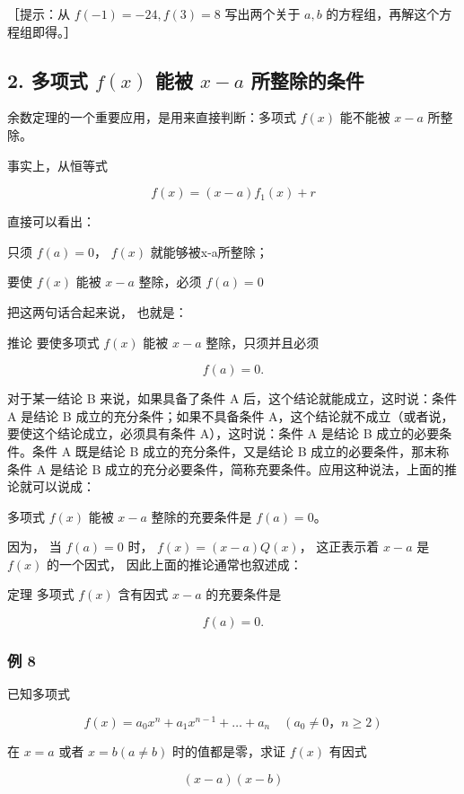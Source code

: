 ［提示：从 \(f(-1) = -24, f(3) = 8\) 写出两个关于 \(a, b\)
的方程组，再解这个方程组即得。］

\subsection{\texorpdfstring{2. 多项式 \(f(x)\) 能被 \(x - a\) 所整除的条件}{2. 多项式 f(x) 能被 x - a 所整除的条件}}

余数定理的一个重要应用，是用来直接判断：多项式 \(f(x)\) 能不能被
\(x - a\) 所整除。

事实上，从恒等式

\[
f (x) = (x - a) f _ {1} (x) + r
\]

直接可以看出：

只须 \(f(a)=0\)， \(f(x)\) 就能够被x-a所整除；

要使 \(f(x)\) 能被 \(x - a\) 整除，必须 \(f(a) = 0\)

把这两句话合起来说， 也就是：

推论 要使多项式 \(f(x)\) 能被 \(x - a\) 整除，只须并且必须

\[
f (a) = 0.
\]

 对于某一结论 B 来说，如果具备了条件 A
后，这个结论就能成立，这时说：条件 A 是结论 B
成立的充分条件；如果不具备条件
A，这个结论就不成立（或者说，要使这个结论成立，必须具有条件
A），这时说：条件 A 是结论 B 成立的必要条件。条件 A 既是结论 B
成立的充分条件，又是结论 B 成立的必要条件，那末称条件 A 是结论 B
成立的充分必要条件，简称充要条件。应用这种说法，上面的推论就可以说成：

多项式 \(f(x)\) 能被 \(x - a\) 整除的充要条件是 \(f(a) = 0\)。

因为， 当 \(f(a) = 0\) 时， \(f(x) = (x - a)Q(x)\)， 这正表示着
\(x - a\) 是 \(f(x)\) 的一个因式， 因此上面的推论通常也叙述成：

定理 多项式 \(f(x)\) 含有因式 \(x - a\) 的充要条件是

\[
f (a) = 0.
\]

\subsubsection{例 8}

已知多项式

\[
f (x) = a _ {0} x ^ {n} + a _ {1} x ^ {n - 1} + \dots + a _ {n} \quad (a _ {0} \neq 0\text{，} n \geqslant 2)
\]

在 \(x = a\) 或者 \(x = b (a \neq b)\) 时的值都是零，求证 \(f(x)\)
有因式

\[
(x-a)(x-b)
\]

